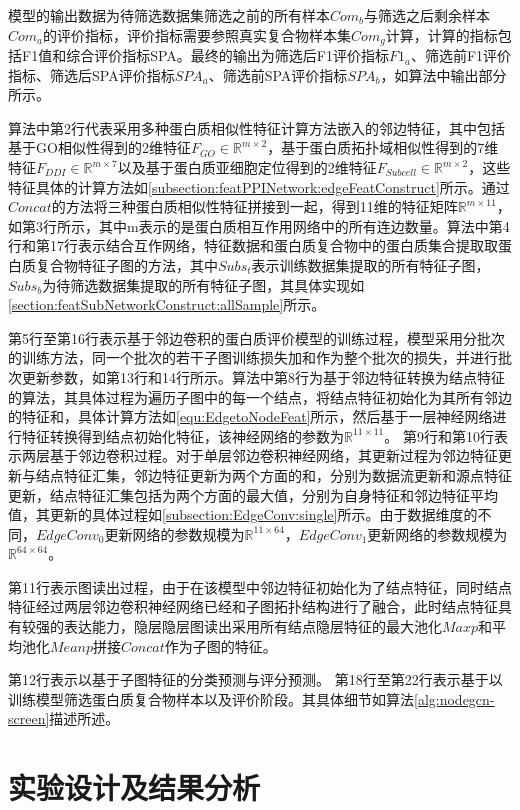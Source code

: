 模型的输出数据为待筛选数据集筛选之前的所有样本$Com_b$与筛选之后剩余样本$Com_a$的评价指标，评价指标需要参照真实复合物样本集$Com_g$计算，计算的指标包括F1值和综合评价指标SPA。最终的输出为筛选后F1评价指标$F1_a$、筛选前F1评价指标、筛选后SPA评价指标$SPA_a$、筛选前SPA评价指标$SPA_b$，如算法中输出部分所示。

算法中第2行代表采用多种蛋白质相似性特征计算方法嵌入的邻边特征，其中包括基于GO相似性得到的2维特征$F_{GO}\in \mathbb{R}^{m\times 2}$，基于蛋白质拓扑域相似性得到的7维特征$F_{DDI}\in \mathbb{R}^{m\times 7}$以及基于蛋白质亚细胞定位得到的2维特征$F_{Subcell}\in \mathbb{R}^{m\times 2}$，这些特征具体的计算方法如\ref{subsection:featPPINetwork:edgeFeatConstruct}所示。通过$Concat$的方法将三种蛋白质相似性特征拼接到一起，得到11维的特征矩阵$\mathbb{R}^{m\times 11}$，如第3行所示，其中m表示的是蛋白质相互作用网络中的所有连边数量。算法中第4行和第17行表示结合互作网络，特征数据和蛋白质复合物中的蛋白质集合提取取蛋白质复合物特征子图的方法，其中$Subs_t$表示训练数据集提取的所有特征子图，$Subs_b$为待筛选数据集提取的所有特征子图，其具体实现如\ref{section:featSubNetworkConstruct:allSample}所示。

第5行至第16行表示基于邻边卷积的蛋白质评价模型的训练过程，模型采用分批次的训练方法，同一个批次的若干子图训练损失加和作为整个批次的损失，并进行批次更新参数，如第13行和14行所示。算法中第8行为基于邻边特征转换为结点特征的算法，其具体过程为遍历子图中的每一个结点，将结点特征初始化为其所有邻边的特征和，具体计算方法如\ref{equ:EdgetoNodeFeat}所示，然后基于一层神经网络进行特征转换得到结点初始化特征，该神经网络的参数为$\mathbb{R}^{11\times 11}$。
第9行和第10行表示两层基于邻边卷积过程。对于单层邻边卷积神经网络，其更新过程为邻边特征更新与结点特征汇集，邻边特征更新为两个方面的和，分别为数据流更新和源点特征更新，结点特征汇集包括为两个方面的最大值，分别为自身特征和邻边特征平均值，其更新的具体过程如\ref{subsection:EdgeConv:single}所示。由于数据维度的不同，$EdgeConv_0$更新网络的参数规模为$\mathbb{R}^{11\times 64}$，$EdgeConv_1$更新网络的参数规模为$\mathbb{R}^{64\times 64}$。

第11行表示图读出过程，由于在该模型中邻边特征初始化为了结点特征，同时结点特征经过两层邻边卷积神经网络已经和子图拓扑结构进行了融合，此时结点特征具有较强的表达能力，隐层隐层图读出采用所有结点隐层特征的最大池化$Maxp$和平均池化$Meanp$拼接$Concat$作为子图的特征。

第12行表示以基于子图特征的分类预测与评分预测。
第18行至第22行表示基于以训练模型筛选蛋白质复合物样本以及评价阶段。其具体细节如算法\ref{alg:nodegcn-screen}描述所述。


\section{实验设计及结果分析}
\label{section:EdgeConv:experience}

